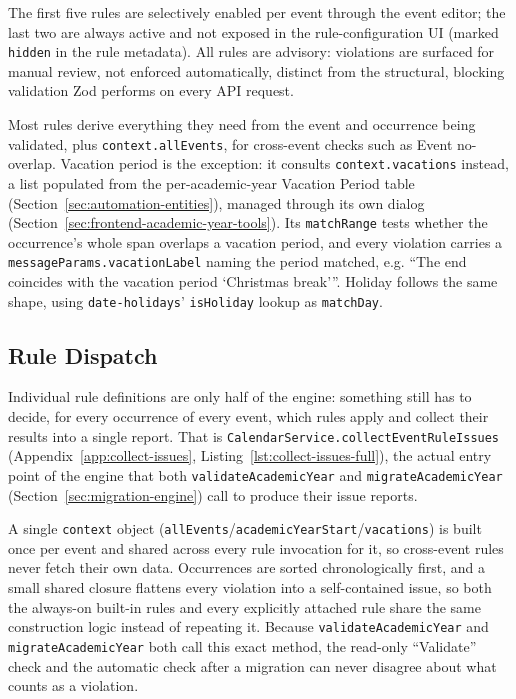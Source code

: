 The first five rules are selectively enabled per event through the event editor; the last two are always active and not exposed in the rule-configuration UI (marked \texttt{hidden} in the rule metadata). All rules are advisory: violations are surfaced for manual review, not enforced automatically, distinct from the structural, blocking validation Zod performs on every API request.

Most rules derive everything they need from the event and occurrence being validated, plus \texttt{context.allEvents}, for cross-event checks such as Event no-overlap. Vacation period is the exception: it consults \texttt{context.vacations} instead, a list populated from the per-academic-year Vacation Period table (Section~\ref{sec:automation-entities}), managed through its own dialog (Section~\ref{sec:frontend-academic-year-tools}). Its \texttt{matchRange} tests whether the occurrence's whole span overlaps a vacation period, and every violation carries a \texttt{messageParams.vacationLabel} naming the period matched, e.g. ``The end coincides with the vacation period `Christmas break'\thinspace''. Holiday follows the same shape, using \texttt{date-holidays}' \texttt{isHoliday} lookup as \texttt{matchDay}.

\subsection{Rule Dispatch} \label{sec:rule-dispatch}

Individual rule definitions are only half of the engine: something still has to decide, for every occurrence of every event, which rules apply and collect their results into a single report. That is \texttt{CalendarService.collectEventRuleIssues} (Appendix~\ref{app:collect-issues}, Listing~\ref{lst:collect-issues-full}), the actual entry point of the engine that both \texttt{validateAcademicYear} and \texttt{migrateAcademicYear} (Section~\ref{sec:migration-engine}) call to produce their issue reports.

A single \texttt{context} object (\texttt{allEvents}/\texttt{academicYearStart}/\texttt{vacations}) is built once per event and shared across every rule invocation for it, so cross-event rules never fetch their own data. Occurrences are sorted chronologically first, and a small shared closure flattens every violation into a self-contained issue, so both the always-on built-in rules and every explicitly attached rule share the same construction logic instead of repeating it. Because \texttt{validateAcademicYear} and \texttt{migrateAcademicYear} both call this exact method, the read-only ``Validate'' check and the automatic check after a migration can never disagree about what counts as a violation.

